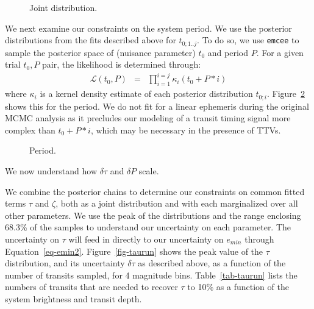 \begin{figure}[t] 
\begin{center} 
\caption{Joint distribution.}
\label{fig-joint} 
\end{center} 
\end{figure}

We next examine our constraints on the system period.  We use the
posterior distributions from the fits described above for
$t_{0;1..j}$.  To do so, we use {\tt emcee} to sample the posterior
space of (nuisance parameter) $t_0$ and period $P$.  For a given trial
$t_0, P$ pair, the likelihood is determined through:
\begin{eqnarray}
\mathcal{L}(t_0, P) & = & \prod_{i=1}^{i=j} \kappa_i(t_0 + P * i)
\end{eqnarray}
where $\kappa_i$ is a kernel density estimate of each posterior
distribution $t_{0;i}$.  Figure~\ref{fig-mcmc2} shows this for the
period.  We do not fit for a linear ephemeris during the original MCMC
analysis as it precludes our modeling of a transit timing signal more
complex than $t_0 + P * i$, which may be necessary in the presence of
TTVs.

\begin{figure}[t] 
\begin{center} 
\caption{Period.}
\label{fig-mcmc2} 
\end{center} 
\end{figure}

We now understand how $\delta \tau$ and $\delta P$ scale.

\medskip
{\centerline{}}
\smallskip


We combine the posterior chains to determine our constraints on common
fitted terms $\tau$ and $\zeta$, both as a joint distribution and with
each marginalized over all other parameters.  We use the peak of the
distributions and the range enclosing 68.3\% of the samples to
understand our uncertainty on each parameter.  The uncertainty on
$\tau$ will feed in directly to our uncertainty on $e_{min}$ through
Equation~\ref{eq-emin2}.  Figure~\ref{fig-taurun} shows the peak value
of the $\tau$ distribution, and its uncertainty $\delta \tau$ as
described above, as a function of the number of transits sampled, for
4 magnitude bins.  Table~\ref{tab-taurun} lists the numbers of
transits that are needed to recover $\tau$ to 10\% as a function of
the system brightness and transit depth.

